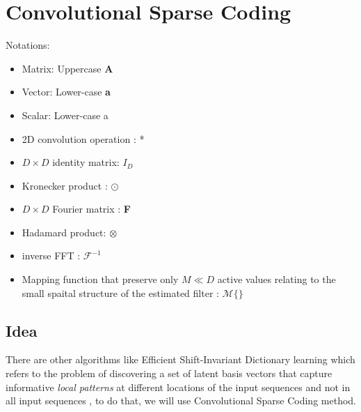 \documentclass[a4paper,10pt]{article}
\begin{document}
\newpage 
\section{Convolutional Sparse Coding}
Notations:
\begin{itemize}
 \item Matrix: Uppercase  \textbf{A}
 \item Vector: Lower-case  \textbf{a}
 \item Scalar: Lower-case a
 \item 2D convolution operation : *
 \item $D \times D$ identity matrix: \textbf{$I_D$}
 \item Kronecker product : $\odot$
 \item $D \times D$ Fourier matrix : \textbf{F}
 \item Hadamard product: $\otimes$
 \item inverse FFT : $ \mathcal{F}^{-1}$
 \item Mapping function that preserve only $M \ll D$ active values relating to the small spaital structure of the estimated filter : $ \mathcal{M}\{\}$
\end{itemize}
\subsection{Idea}
There are other algorithms like Efficient Shift-Invariant Dictionary learning which refers to the problem of discovering a set of latent basis vectors that capture informative \textit{local patterns} at different locations of the input sequences and not in all input sequences \cite{Zheng:2016:ESD:2939672.2939824}, to do that, we will use Convolutional Sparse Coding method.  
\end{document}
